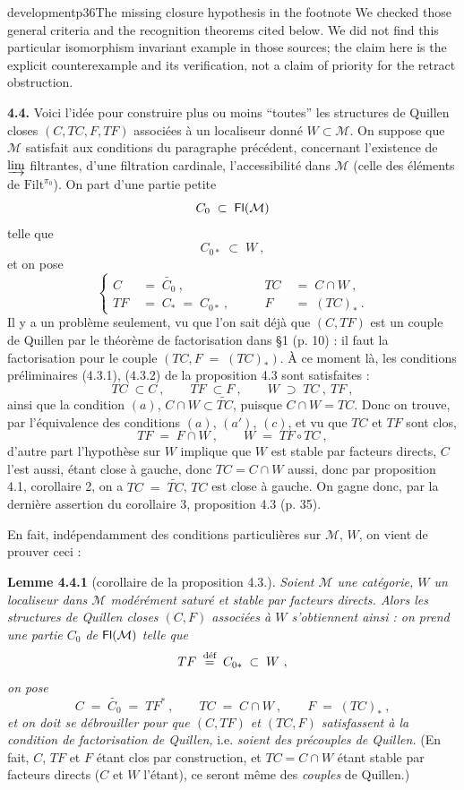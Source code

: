 \begin{dcomment}{development}{p36}{The missing closure hypothesis in the footnote}
We checked those general criteria and the recognition theorems cited below. We did not find this particular isomorphism invariant example in those sources; the claim here is the explicit counterexample and its verification, not a claim of priority for the retract obstruction.
\end{dcomment}


\textbf{4.4.} Voici l'idée pour construire plus ou moins “toutes” les structures de Quillen closes $(C,TC,F,TF)$ associées à un localiseur donné $W\subset\mathcal{M}$. On suppose que $\mathcal{M}$ satisfait aux conditions du paragraphe précédent, concernant l'existence de $\varinjlim$ filtrantes, d'une filtration cardinale, l'accessibilité dans $\mathcal{M}$ (celle des éléments de $\mathrm{Filt}^{\pi_0}$). On part d'une partie petite
\[
C_0\;\subset\;\mathsf{Fl}(\mathcal{M})
\]
telle que
\[
C_{0*}\;\subset\;W\ , \tag*{(4.4.1)}
\]
et on pose
\[
\left\{
\begin{aligned}
C &\;=\;\widetilde{C_0}\ , &\qquad TC &\;=\;C\cap W\ ,\\
TF &\;=\;C_*\;=\;C_{0*}\ , &\qquad F &\;=\;(TC)_*\ .
\end{aligned}
\right.
\tag*{(4.4.2)}
\]
Il y a un problème seulement, vu que l'on sait déjà que $(C,TF)$ est un couple de Quillen par le théorème de factorisation dans §1 (p. 10) : il faut la factorisation pour le couple $(TC,F\;=\;(TC)_*)$. À ce moment là, les conditions préliminaires (4.3.1), (4.3.2) de la proposition 4.3 sont satisfaites :
\[
TC\;\subset C\ ,\qquad TF\;\subset F\ ,\qquad W\;\supset\;TC\ ,\ TF\ ,
\]
ainsi que la condition $(a)$, $C\cap W\subset\widetilde{TC}$, puisque $C\cap W=TC$. Donc on trouve, par l'équivalence des conditions $(a)$, $(a')$, $(c)$, et vu que $TC$ et $TF$ sont clos,
\[
TF\;=\;F\cap W\ ,\qquad W\;=\;TF\circ TC\ ,
\]
d'autre part l'hypothèse sur $W$ implique que $W$ est stable par facteurs directs, $C$ l'est aussi, étant close à gauche, donc $TC=C{\cap}W$ aussi, donc par proposition 4.1, corollaire 2, on a $TC\;=\;\widetilde{TC}$, $TC$ est close à gauche. On gagne donc, par la dernière assertion du corollaire 3, proposition 4.3 (p. 35).

En fait, indépendamment des conditions particulières sur $\mathcal{M}$, $W$, on vient de prouver ceci :

\textbf{Lemme 4.4.1} (corollaire de la proposition 4.3.). \textit{Soient $\mathcal{M}$ une catégorie, $W$ un localiseur dans $\mathcal{M}$ modérément saturé et stable par facteurs directs. Alors les structures de Quillen closes $(C,F)$ associées à $W$ s'obtiennent ainsi : on prend une partie $C_0$ de} $\mathsf{Fl}(\mathcal{M})$ \textit{telle que}
\[
TF\;\deq\;C_{0*}\;\subset\;W\ ,
\]
\textit{on pose}
\[
C\;=\;\widetilde{C_0}\;=\;TF^*\ ,\qquad TC\;=\;C\cap W\ ,\qquad F\;=\;(TC)_*\ ,
\]
\textit{et on doit se débrouiller pour que $(C,TF)$ et $(TC,F)$ satisfassent à la condition de factorisation de Quillen,} i.e. \textit{soient des précouples de Quillen.} (En fait, $C$, $TF$ et $F$ étant clos par construction, et $TC=C\cap W$ étant stable par facteurs directs ($C$ et $W$ l'étant), ce seront même des \textit{couples} de Quillen.)

